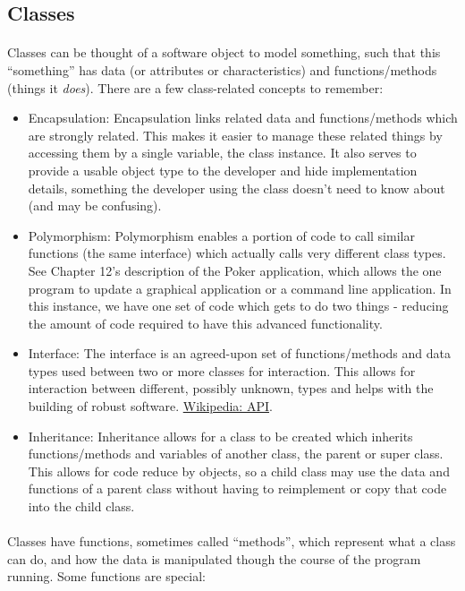 \documentclass[letter,10pt]{article}
\begin{document}
\subsection{Classes}
\paragraph{}Classes can be thought of a software object to model something, such that this ``something'' has data (or attributes or characteristics) and functions/methods (things it \textit{does}). There are a few class-related concepts to remember:

\begin{itemize}
    \item Encapsulation: Encapsulation links related data and functions/methods which are strongly related. This makes it easier
to manage these related things by accessing them by a single variable, the class instance. It also serves to provide a usable object type to the developer and hide implementation details, something the developer using the class doesn't need to know about (and may be confusing).
    \item Polymorphism: Polymorphism enables a portion of code to call similar functions (the same interface) which actually
calls very different class types. See Chapter 12’s description of the Poker application, which allows
the one program to update a graphical application or a command line application. In this instance, we
have one set of code which gets to do two things - reducing the amount of code required to have this
advanced functionality.
    \item Interface: The interface is an agreed-upon set of functions/methods and data types used between two or more classes for interaction. This allows for interaction between different, possibly unknown, types and helps with the building of robust software. \href{https://en.wikipedia.org/wiki/API}{Wikipedia: API}.
    \item Inheritance: Inheritance allows for a class to be created which inherits functions/methods and variables of another
class, the parent or super class. This allows for code reduce by objects, so a child class may use the
data and functions of a parent class without having to reimplement or copy that code into the child
class.
\end{itemize}

\paragraph{}Classes have functions, sometimes called ``methods'', which represent what a class can do, and how the data is manipulated though the course of the program running. Some functions are special:
\end{document}
